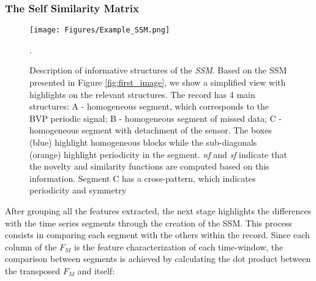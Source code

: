 
\subsubsection{The Self Similarity Matrix}
\label{sec:the_ssm}

\begin{figure}
    \centering
    \texttt{[image: Figures/Example\_SSM.png]}
    \caption{Description of informative structures of the \textit{SSM}. Based on the \gls{SSM} presented in Figure \ref{fig:first_image}, we show a simplified view with highlights on the relevant structures. The record has 4 main structures: A - homogeneous segment, which corresponds to the BVP periodic signal; B - homogeneous segment of missed data; C - homogeneous segment with detachment of the sensor. The boxes (blue) highlight homogeneous blocks while the sub-diagonals (orange) highlight periodicity in the segment. \textit{nf} and \textit{sf} indicate that the novelty and similarity functions are computed based on this information. Segment C has a cross-pattern, which indicates periodicity and symmetry}. 
    \label{fig:ssm_description}
\end{figure}

After grouping all the features extracted, the next stage highlights the differences with the time series segments through the creation of the \gls{SSM}. This process consists in comparing each segment with the others within the record. Since each column of the $F_M$ is the feature characterization of each time-window, the comparison between segments is achieved by calculating the dot product between the transposed $F_{M}$ and itself:


